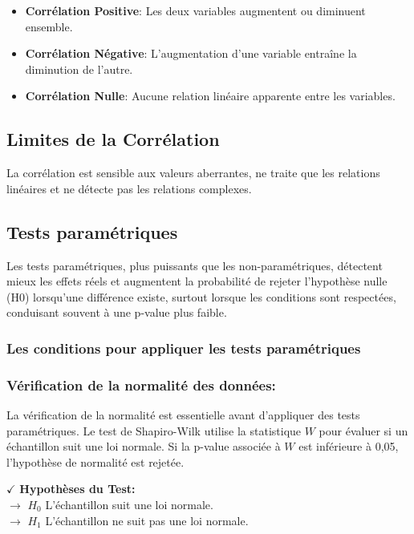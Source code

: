 \begin{itemize}
 \item \textbf{Corrélation Positive}: Les deux variables augmentent ou diminuent ensemble.
 \item \textbf{Corrélation Négative}: L'augmentation d'une variable entraîne la diminution de l'autre.
 \item \textbf{Corrélation Nulle}: Aucune relation linéaire apparente entre les variables.
\end{itemize}

\subsection*{Limites de la Corrélation} 

La corrélation est sensible aux valeurs aberrantes, ne traite que les relations linéaires et ne détecte pas les relations complexes.

\subsection{Tests paramétriques}

Les tests paramétriques, plus puissants que les non-paramétriques, détectent mieux les effets réels et augmentent la probabilité de rejeter l'hypothèse nulle (H0) lorsqu'une différence existe, surtout lorsque les conditions sont respectées, conduisant souvent à une p-value plus faible.
\subsubsection{Les conditions pour appliquer les tests paramétriques}
\subsubsection*{Vérification de la normalité des données:}

La vérification de la normalité est essentielle avant d'appliquer des tests paramétriques. Le test de Shapiro-Wilk \cite{11} utilise la statistique \( W \) pour évaluer si un échantillon suit une loi normale. Si la p-value associée à \( W \) est inférieure à 0,05, l'hypothèse de normalité est rejetée.

\textbf{\(\checkmark\)} \textbf{Hypothèses du Test:}\\
\noindent \textbf{\(\rightarrow\)} \( H_0 \) L'échantillon suit une loi normale.\\
\textbf{\(\rightarrow\)} \( H_1 \) L'échantillon ne suit pas une loi normale.

